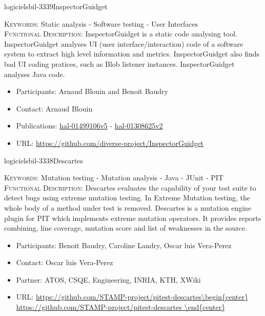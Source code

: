 \documentclass{ra2018}
\begin{document}
 \begin{module}{logiciels}{bil-3339}{InspectorGuidget}

   \textsc{Keywords:} Static analysis - Software testing - User Interfaces \\ 


   

 \textsc{Functional Description:}  InspectorGuidget is a static code analysing tool. InspectorGuidget analyses UI (user interface/interaction) code  of a software system to extract high level information and metrics. InspectorGuidget also finds bad UI coding pratices, such as Blob listener instances. InspectorGuidget analyses Java code.\\

   \begin{itemize}
      \item Participants: Arnaud Blouin and Benoit Baudry
      \item Contact: Arnaud Blouin
      \item Publications: \href{https://hal.inria.fr/hal-01499106v5}{hal-01499106v5} - 
 \href{https://hal.inria.fr/hal-01308625v2}{hal-01308625v2}
      \item URL: \url{https://github.com/diverse-project/InspectorGuidget}
   \end{itemize}

 \end{module}

 \begin{module}{logiciels}{bil-3338}{Descartes}
	
	\textsc{Keywords:} Mutation testing - Mutation analysis - Java - JUnit - PIT \\ 
	
	
	
	
	\textsc{Functional Description:}  Descartes evaluates the capability of your test suite to detect bugs using extreme mutation testing. In Extreme Mutation testing, the whole body of a method under test is removed. Descartes is a mutation engine plugin for PIT which implements extreme mutation operators. It provides reports combining, line coverage, mutation score and list of weaknesses in the source.\\
	
	\begin{itemize}
		\item Participants: Benoit Baudry, Caroline Landry, Oscar luis Vera-Perez
		\item Contact: Oscar luis Vera-Perez
		\item Partner: ATOS, CSQE, Engineering, INRIA, KTH, XWiki
		\item URL: \url{https://github.com/STAMP-project/pitest-descartes\begin{center}
				https://github.com/STAMP-project/pitest-descartes
		\end{center}}
	\end{itemize}
\end{module}
\end{document}
